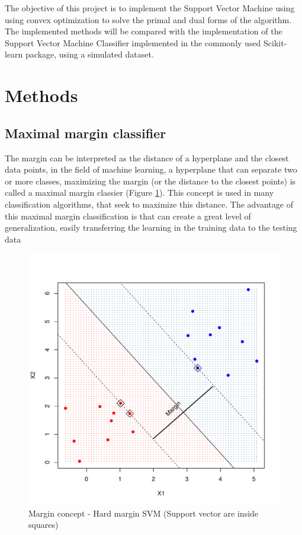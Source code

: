 \documentclass[11pt,twocolumn,letterpaper]{article}
\begin{document}
The objective of this project is to implement the Support Vector Machine using using convex optimization to solve the primal and dual forms of the algorithm. The implemented methods will be compared with the implementation of the Support Vector Machine Classifier implemented in the commonly used Scikit-learn package, using a simulated dataset.



\section{Methods}

\subsection{Maximal margin classifier}

The margin can be interpreted as the distance of a hyperplane and the closest data points, in the field of machine learning, a hyperplane that can separate two or more classes, maximizing the margin (or the distance to the closest points) is called a maximal margin classier (Figure \ref{fig:margin}). This concept is used in many classification algorithms, that seek to maximize this distance. The advantage of this maximal margin classification is that can create a great level of generalization, easily transferring the learning in the training data to the testing data

\begin{figure}[h]
	\begin{center}
		\includegraphics[width=1.0\linewidth]{margin.pdf}
	\end{center}
	\caption{Margin concept - Hard margin SVM (Support vector are inside squares)}
	\label{fig:margin}
\end{figure}
\end{document}
